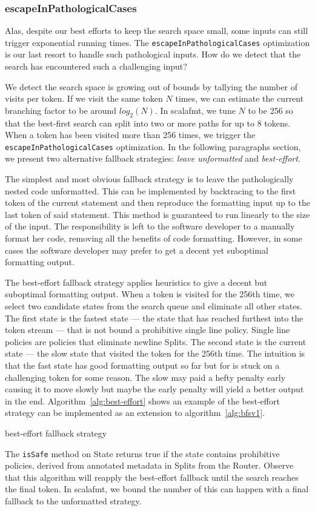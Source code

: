 \subsubsection{escapeInPathologicalCases}
Alas, despite our best efforts to keep the search space small, some inputs can still trigger exponential running times.
The \texttt{escapeInPathologicalCases} optimization is our last resort to handle such pathological inputs.
How do we detect that the search has encountered such a challenging input?

We detect the search space is growing out of bounds by tallying the number of visits per token.
If we visit the same token $N$ times, we can estimate the current branching factor to be around $log_2(N)$.
In scalafmt, we tune $N$ to be 256 so that the best-first search can split into two or more paths for up to 8 tokens.
When a token has been visited more than 256 times, we trigger the \texttt{escapeInPathologicalCases} optimization.
In the following paragraphs section, we present two alternative fallback strategies: \emph{leave unformatted} and \emph{best-effort}.

The simplest and most obvious fallback strategy is to leave the pathologically nested code unformatted.
This can be implemented by backtracing to the first token of the current statement and then reproduce the formatting input up to the last token of said statement.
This method is guaranteed to run linearly to the size of the input.
The responsibility is left to the software developer to a manually format her code, removing all the benefits of code formatting.
However, in some cases the software developer may prefer to get a decent yet suboptimal formatting output.

The best-effort fallback strategy applies heuristics to give a decent but suboptimal formatting output.
When a token is visited for the 256th time, we select two candidate states from the search queue and eliminate all other states.
The first state is the fastest state --- the state that has reached furthest into the token stream --- that is not bound a prohibitive single line policy.
Single line policies are policies that eliminate newline Splits.
The second state is the current state --- the slow state that visited the token for the 256th time.
The intuition is that the fast state has good formatting output so far but for is stuck on a challenging token for some reason.
The slow may paid a hefty penalty early causing it to move slowly but maybe the early penalty will yield a better output in the end.
Algorithm~\ref{alg:best-effort} shows an example of the best-effort strategy can be implemented as an extension to algorithm~\ref{alg:bfsv1}.
\begin{algorithm}
  \caption{best-effort fallback strategy}\label{alg:best-effort}
  
\end{algorithm}
The \texttt{isSafe} method on State returns true if the state contains prohibitive policies, derived from annotated metadata in Splits from the Router.
Observe that this algorithm will reapply the best-effort fallback until the search reaches the final token.
In scalafmt, we bound the number of this can happen with a final fallback to the unformatted strategy.

